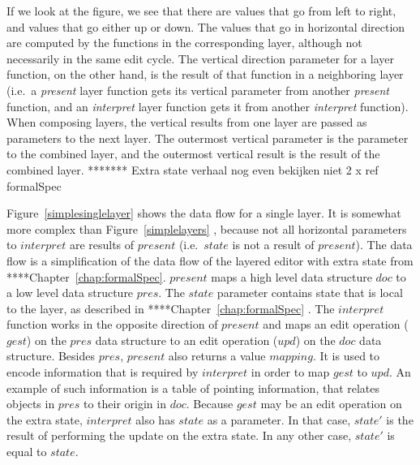 \documentclass[preprint,natbib]{sigplanconf}
\begin{document}



\bc
If we look at the figure, we see that there are values that go from left to right, and values that go either up or down. The values that go in horizontal direction are computed by the functions in the corresponding layer, although not necessarily in the same edit cycle. The vertical direction parameter for a layer function, on the other hand, is the result of that function in a neighboring layer (i.e.\ a {\em present} layer function gets its vertical parameter from another {\em present} function, and an {\em interpret} layer function gets it from another {\em interpret} function). When composing layers, the vertical results from one layer are passed as parameters to the next layer. The outermost vertical parameter is the parameter to the combined layer, and the outermost vertical result is the result of the combined layer. 
\ec
\bc
******* Extra state verhaal nog even bekijken  niet 2 x ref formalSpec

Figure~\ref{simplesinglelayer} shows the data flow for a single layer. It is somewhat more complex than Figure~\ref{simplelayers} , because not all horizontal parameters to $interpret$ are results of $present$  (i.e.\ $state$ is not a result of $present$). The data flow is a simplification of the data flow of the layered editor with extra state from ****Chapter~\ref{chap:formalSpec}. $present$ maps a high level data structure $doc$ to a low level data structure $pres$. The $state$ parameter contains state that is local to the layer, as described in ****Chapter~\ref{chap:formalSpec} . The $interpret$ function works in the opposite direction of $present$ and maps an edit operation ($gest$) on the $pres$ data structure to an edit operation ($upd$) on the $doc$ data structure. Besides $pres$, $present$ also returns a value $mapping$. It is used to encode information that is required by $interpret$ in order to map $gest$ to $upd$. An example of such information is a table of pointing information, that relates objects in $pres$ to their origin in $doc$. Because $gest$ may be an edit operation on the extra state, $interpret$ also has $state$ as a parameter. In that case, $state'$ is the result of performing the update on the extra state. In any other case, $state'$ is equal to $state$. 
\ec
\end{document}
